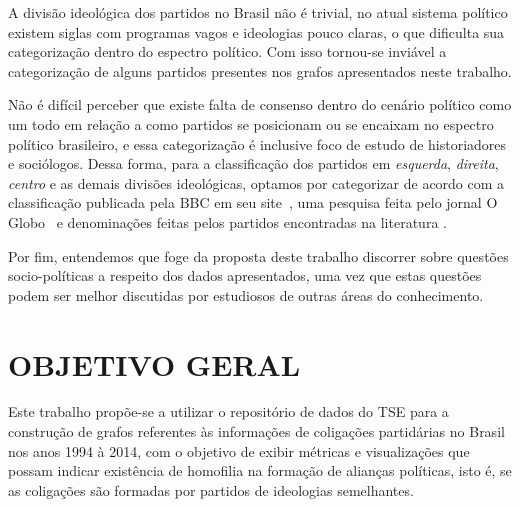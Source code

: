 A divisão ideológica dos partidos no Brasil não é trivial, no atual sistema político existem siglas com programas vagos e ideologias pouco claras, o que dificulta sua categorização dentro do espectro político. Com isso tornou-se inviável a categorização de alguns partidos presentes nos grafos apresentados neste trabalho.

Não é difícil perceber que existe falta de consenso dentro do cenário político como um todo em relação a como partidos se posicionam ou se encaixam no espectro político brasileiro, e essa categorização é inclusive foco de estudo de historiadores e sociólogos. Dessa forma, para a classificação dos partidos em \emph{esquerda}, \emph{direita}, \emph{centro} e as demais divisões ideológicas, optamos por categorizar de acordo com a classificação publicada pela BBC em seu site~\cite{shalders2017direiraesquerda}, uma pesquisa feita pelo jornal O Globo~\cite{vasconcellos2016posicionamentopartidos} e denominações feitas pelos partidos encontradas na literatura  \cite{}. 

Por fim, entendemos que foge da proposta deste trabalho discorrer sobre questões socio-políticas a respeito dos dados apresentados, uma vez que estas questões podem ser melhor discutidas por estudiosos de outras áreas do conhecimento. 





\section{\texorpdfstring{\MakeUppercase{Objetivo Geral}}{}}
\label{proposta__objetivo-geral}

Este trabalho propõe-se a utilizar o repositório de dados do \gls{TSE} para a construção de grafos referentes às informações de coligações partidárias no Brasil nos anos 1994 à 2014, com o objetivo de exibir métricas e visualizações que possam indicar existência de homofilia na formação de alianças políticas, isto é, se as coligações são formadas por partidos de ideologias semelhantes.

